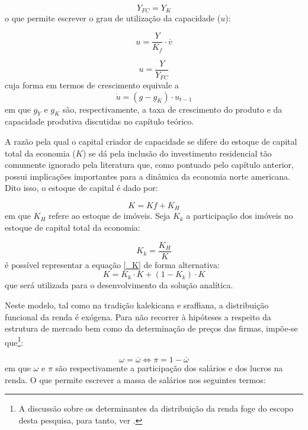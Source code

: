 \begin{equation}
\label{_YFC}
    Y_{FC} = Y_K
\end{equation}
o que permite escrever o grau de utilização da capacidade ($u$):

$$
u = \frac{Y}{K_f}\cdot \overline v
$$

\begin{equation}
\label{_u}
    u = \frac{Y}{Y_{FC}}
\end{equation}
cuja forma em termos de crescimento equivale a
\begin{equation}
\label{Aux}
\tag{Aux.}
\dot u = (g - g_K)\cdot u_{t-1}
\end{equation}
em que $g_Y$ e $g_K$ são, respectivamente, a taxa de crescimento do produto e da capacidade produtiva discutidas no capítulo teórico.


A razão pela qual o capital criador de capacidade se difere do estoque de capital total da economia ($K$) se dá pela inclusão do investimento residencial tão comumente ignorado pela literatura que, como pontuado pelo capítulo anterior, possui implicações importantes para a dinâmica da economia norte americana. Dito isso, o estoque de capital é dado por:

\begin{equation}
\label{_K}
    K = Kf + K_{H}
\end{equation}
em que $K_H$ refere ao estoque de imóveis. Seja $K_k$ a participação dos imóveis no estoque de capital total da economia:

\begin{equation}
\label{_tau}
K_k = \frac{K_H}{K}    
\end{equation}
é possível representar a equação \ref{_K} de forma alternativa:
$$
K = K_k\cdot K + (1-K_k)\cdot K
$$
que será utilizada para o desenvolvimento da solução analítica.

Neste modelo, tal como na tradição kalekicana e sraffiana, a distribuição funcional da renda é exógena. Para não recorrer à hipóteses a respeito da estrutura de mercado bem como da determinação de preços das firmas, impõe-se que\footnote{A discussão sobre os determinantes da distribuição da renda foge do escopo desta pesquisa, para tanto, ver \textcite{pivetti_essay_1992}. }:

\begin{equation}
    \omega = \overline{\omega} \Leftrightarrow \pi = 1 - \overline{\omega}
\end{equation}
em que $\omega$ e $\pi$ são respectivamente a participação dos salários e dos lucros na renda. O que permite escrever a massa de salários nos seguintes termos:

